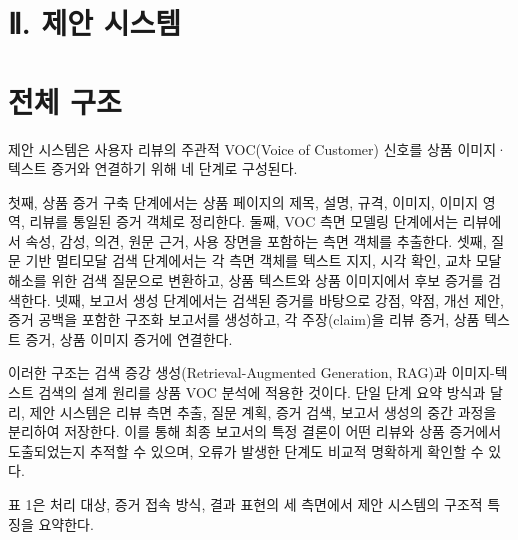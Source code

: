 \documentclass[11pt]{article}
\begin{document}
\section{Ⅱ. 제안 시스템}


\section{전체 구조}
제안 시스템은 사용자 리뷰의 주관적 VOC(Voice of Customer) 신호를 상품 이미지·텍스트 증거와 연결하기 위해 네 단계로 구성된다.

첫째, 상품 증거 구축 단계에서는 상품 페이지의 제목, 설명, 규격, 이미지, 이미지 영역, 리뷰를 통일된 증거 객체로 정리한다. 둘째, VOC 측면 모델링 단계에서는 리뷰에서 속성, 감성, 의견, 원문 근거, 사용 장면을 포함하는 측면 객체를 추출한다. 셋째, 질문 기반 멀티모달 검색 단계에서는 각 측면 객체를 텍스트 지지, 시각 확인, 교차 모달 해소를 위한 검색 질문으로 변환하고, 상품 텍스트와 상품 이미지에서 후보 증거를 검색한다. 넷째, 보고서 생성 단계에서는 검색된 증거를 바탕으로 강점, 약점, 개선 제안, 증거 공백을 포함한 구조화 보고서를 생성하고, 각 주장(claim)을 리뷰 증거, 상품 텍스트 증거, 상품 이미지 증거에 연결한다.

이러한 구조는 검색 증강 생성(Retrieval-Augmented Generation, RAG)과 이미지-텍스트 검색의 설계 원리를 상품 VOC 분석에 적용한 것이다\citep{lewis2020retrievalAugmentedGeneration,gao2023rarr}. 단일 단계 요약 방식과 달리, 제안 시스템은 리뷰 측면 추출, 질문 계획, 증거 검색, 보고서 생성의 중간 과정을 분리하여 저장한다. 이를 통해 최종 보고서의 특정 결론이 어떤 리뷰와 상품 증거에서 도출되었는지 추적할 수 있으며, 오류가 발생한 단계도 비교적 명확하게 확인할 수 있다.

표 1은 처리 대상, 증거 접속 방식, 결과 표현의 세 측면에서 제안 시스템의 구조적 특징을 요약한다.
\end{document}
